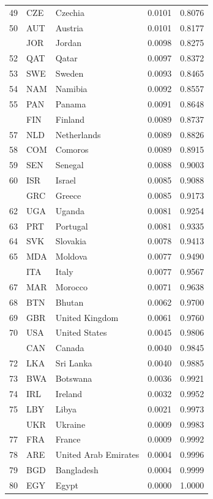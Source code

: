 \documentclass[referee,pdflatex,sn-basic]{sn-jnl}
\theoremstyle{thmstylethree}
\begin{document}
\begin{ThreePartTable}
\begin{longtable}[t]{rllrr}
49 & CZE & Czechia & 0.0101 & 0.8076\\
50 & AUT & Austria & 0.0101 & 0.8177\\
\addlinespace
51 & JOR & Jordan & 0.0098 & 0.8275\\
52 & QAT & Qatar & 0.0097 & 0.8372\\
53 & SWE & Sweden & 0.0093 & 0.8465\\
54 & NAM & Namibia & 0.0092 & 0.8557\\
55 & PAN & Panama & 0.0091 & 0.8648\\
\addlinespace
56 & FIN & Finland & 0.0089 & 0.8737\\
57 & NLD & Netherlands & 0.0089 & 0.8826\\
58 & COM & Comoros & 0.0089 & 0.8915\\
59 & SEN & Senegal & 0.0088 & 0.9003\\
60 & ISR & Israel & 0.0085 & 0.9088\\
\addlinespace
61 & GRC & Greece & 0.0085 & 0.9173\\
62 & UGA & Uganda & 0.0081 & 0.9254\\
63 & PRT & Portugal & 0.0081 & 0.9335\\
64 & SVK & Slovakia & 0.0078 & 0.9413\\
65 & MDA & Moldova & 0.0077 & 0.9490\\
\addlinespace
66 & ITA & Italy & 0.0077 & 0.9567\\
67 & MAR & Morocco & 0.0071 & 0.9638\\
68 & BTN & Bhutan & 0.0062 & 0.9700\\
69 & GBR & United Kingdom & 0.0061 & 0.9760\\
70 & USA & United States & 0.0045 & 0.9806\\
\addlinespace
71 & CAN & Canada & 0.0040 & 0.9845\\
72 & LKA & Sri Lanka & 0.0040 & 0.9885\\
73 & BWA & Botswana & 0.0036 & 0.9921\\
74 & IRL & Ireland & 0.0032 & 0.9952\\
75 & LBY & Libya & 0.0021 & 0.9973\\
\addlinespace
76 & UKR & Ukraine & 0.0009 & 0.9983\\
77 & FRA & France & 0.0009 & 0.9992\\
78 & ARE & United Arab Emirates & 0.0004 & 0.9996\\
79 & BGD & Bangladesh & 0.0004 & 0.9999\\
80 & EGY & Egypt & 0.0000 & 1.0000\\

\end{longtable}
\end{ThreePartTable}
\end{document}
